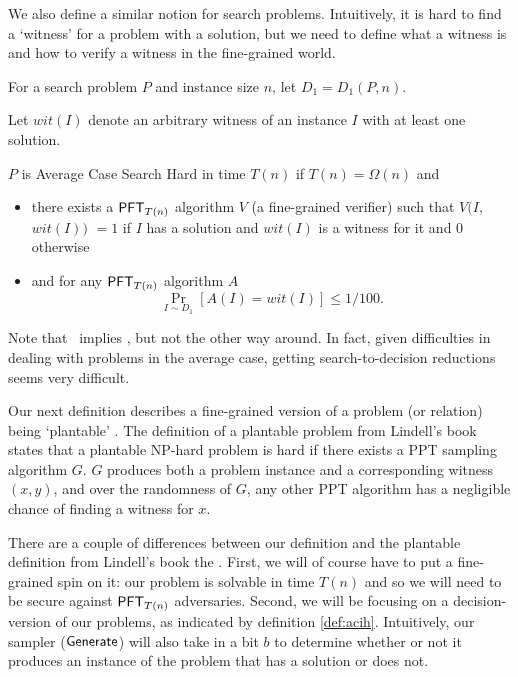 We also define a similar notion for search problems. Intuitively, it is hard to find a `witness' for a problem with a solution, but we need to define what a witness is and how to verify a witness in the fine-grained world.

\begin{definition}
	\label{def:acsh}
	For a search problem $P$ and instance size $n$, let $D_1 = D_{1}(P,n)$.
	
	Let $wit(I)$ denote an arbitrary witness of an instance $I$ with at least one solution.
	
	$P$ is Average Case Search Hard in time $T(n)$ if $T(n)=\Omega(n)$ and
	\begin{itemize}
		\item there exists a $\mathsf{PFT}_{T(n)}$ algorithm $V$ (a fine-grained verifier) such that $V(I,$ $wit(I))$ $= 1$ if $I$ has a solution and $wit(I)$ is a witness for it and $0$ otherwise
		\item and for any  $\mathsf{PFT}_{ T(n)}$ algorithm $A$
		\[ \Pr_{I \sim D_1}[A(I) = wit(I)] \le 1/100. \]
	\end{itemize}
\end{definition}

Note that \ACIH~implies \ACSH, but not the other way around. In fact, given difficulties in dealing with problems in the average case, getting search-to-decision reductions seems very difficult.

Our next definition describes a fine-grained version of a problem (or relation) being `plantable' \cite{Lindell}. The definition of a plantable problem from Lindell's book states that a plantable NP-hard problem is hard if there exists a PPT sampling algorithm $G$. $G$ produces both a problem instance and a corresponding witness $(x,y)$, and over the randomness of $G$, any other PPT algorithm has a negligible chance of finding a witness for $x$.

There are a couple of differences between our definition and the plantable definition from Lindell's book the  \cite{Lindell}. First, we will of course have to put a fine-grained spin on it: our problem is solvable in time $T(n)$ and so we will need to be secure against $\mathsf{PFT}_{T(n)}$ adversaries. Second, we will be focusing on a decision-version of our problems, as indicated by definition \ref{def:acih}. Intuitively, our sampler ($\mathsf{Generate}$) will also take in a bit $b$ to determine whether or not it produces an instance of the problem that has a solution or does not.

